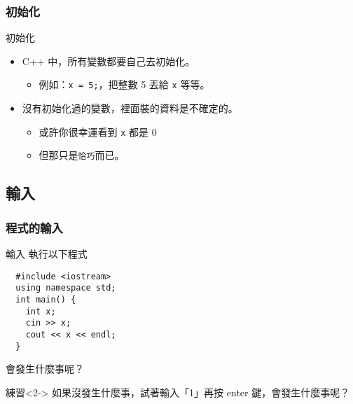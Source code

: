 \documentclass[utf8]{beamer}
\begin{document}
\begin{CJK}{UTF8}{bkai}
\begin{frame}[fragile]
  \frametitle{初始化}
  \begin{alertblock}{初始化}
    \begin{itemize}[<+->]
    \item C++ 中，所有變數都要自己去\alert{初始化}。
      \begin{itemize}
      \item 例如：\lstinline{x = 5;}，把整數 5 丟給 \lstinline{x} 等等。
      \end{itemize}
    \item 沒有初始化過的變數，裡面裝的資料是\alert{不確定}的。
      \begin{itemize}[<+->]
      \item 或許你很幸運看到 \lstinline{x} 都是 0
      \item 但那只是\lstinline{恰巧}而已。
      \end{itemize}
    \end{itemize}
  \end{alertblock}
\end{frame}

\subsection{輸入}

\begin{frame}[fragile]
  \frametitle{程式的輸入}
  \begin{block}{輸入}
    執行以下程式
    \begin{lstlisting}
  #include <iostream>
  using namespace std;
  int main() {
    int x;
    cin >> x;
    cout << x << endl;
  }
    \end{lstlisting}
    會發生什麼事呢？
  \end{block}
  \begin{block}{練習}<2->
  如果沒發生什麼事，試著輸入「1」再按 enter 鍵，會發生什麼事呢？
  \end{block}
\end{frame}


\end{CJK}
\end{document}
